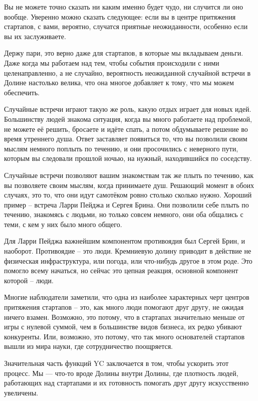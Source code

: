 \documentclass[ebook,12pt,oneside,openany]{memoir}
\begin{document}
Вы не можете точно сказать ни каким именно будет чудо, ни случится ли
оно вообще. Уверенно можно сказать следующее: если вы в центре
притяжения стартапов, с вами, вероятно, случатся приятные
неожиданности, особенно если вы их заслуживаете.

Держу пари, это верно даже для стартапов, в которые мы вкладываем
деньги. Даже когда мы работаем над тем, чтобы события происходили с
ними целенаправленно, а не случайно, вероятность неожиданной случайной
встречи в Долине настолько велика, что она многое добавляет к тому,
что мы можем обеспечить.

Случайные встречи играют такую же роль, какую отдых играет для новых
идей. Большинству людей знакома ситуация, когда вы много работаете над
проблемой, не можете её решить, бросаете и идёте спать, а потом
обдумываете решение во время утреннего душа. Ответ заставляет
появиться то, что вы позволили своим мыслям немного поплыть по
течению, и они просочились с неверного пути, которым вы следовали
прошлой ночью, на нужный, находившийся по соседству.

Случайные встречи позволяют вашим знакомствам так же плыть по течению,
как вы позволяете своим мыслям, когда принимаете душ. Решающий момент
в обоих случаях, это то, что они идут самотёком ровно столько сколько
нужно. Хороший пример – встреча Ларри Пейджа и Сергея Брина. Они
позволили себе плыть по течению, знакомясь с людьми, но только совсем
немного, они оба общались с теми, с кем у них было много общего.

Для Ларри Пейджа важнейшим компонентом противоядия был Сергей Брин, и
наоборот. Противоядие – это люди. Кремниевую долину приводит в
действие не физическая инфраструктура, или погода, или что-нибудь
другое в этом роде. Это помогло всему начаться, но сейчас это цепная
реакция, основной компонент которой – люди.

Многие наблюдатели заметили, что одна из наиболее характерных черт
центров притяжения стартапов – это, как много люди помогают друг
другу, не ожидая ничего взамен. Возможно, это потому, что в стартапах
значительно меньше от игры с нулевой суммой, чем в большинстве видов
бизнеса, их редко убивают конкуренты. Или, возможно, это потому, что
так много основателей стартапов вышли из мира науки, где
сотрудничество поощряется.

Значительная часть функций YC заключается в том, чтобы ускорить этот
процесс. Мы — что-то вроде Долины внутри Долины, где плотность людей,
работающих над стартапами и их готовность помогать друг другу
искусственно увеличены.
\end{document}
